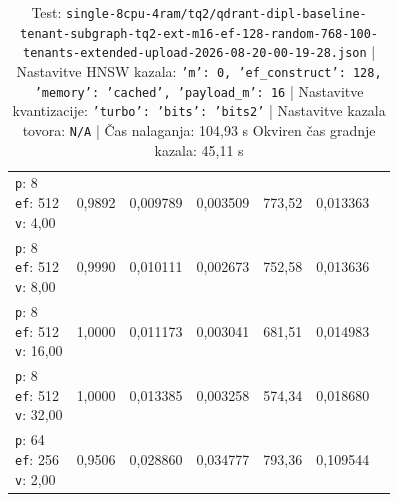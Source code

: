 \begin{table}[htbp]
\begin{tabularx}{\textwidth}{Xrrrrrr}
    \makecell{\texttt{p}: 8\\\texttt{ef}: 512\\\texttt{v}: 4,00} & 0,9892 & 0,009789 & 0,003509 & 773,52 & 0,013363 \\
    \makecell{\texttt{p}: 8\\\texttt{ef}: 512\\\texttt{v}: 8,00} & 0,9990 & 0,010111 & 0,002673 & 752,58 & 0,013636 \\
    \makecell{\texttt{p}: 8\\\texttt{ef}: 512\\\texttt{v}: 16,00} & 1,0000 & 0,011173 & 0,003041 & 681,51 & 0,014983 \\
    \makecell{\texttt{p}: 8\\\texttt{ef}: 512\\\texttt{v}: 32,00} & 1,0000 & 0,013385 & 0,003258 & 574,34 & 0,018680 \\
    \makecell{\texttt{p}: 64\\\texttt{ef}: 256\\\texttt{v}: 2,00} & 0,9506 & 0,028860 & 0,034777 & 793,36 & 0,109544 \\
    \bottomrule
  \end{tabularx}
\caption* {Test: \texttt{single-8cpu-4ram/tq2/qdrant-dipl-baseline-tenant-subgraph-tq2-ext-m16-ef-128-random-768-100-tenants-extended-upload-2026-08-20-00-19-28.json} | Nastavitve HNSW kazala: \texttt{{'m': 0, 'ef\_construct': 128, 'memory': 'cached', 'payload\_m': 16}} | Nastavitve kvantizacije: \texttt{{'turbo': {'bits': 'bits2'}}} | Nastavitve kazala tovora: \texttt{N/A} | Čas nalaganja: 104,93 s Okviren čas gradnje kazala: 45,11 s}\end{table}


